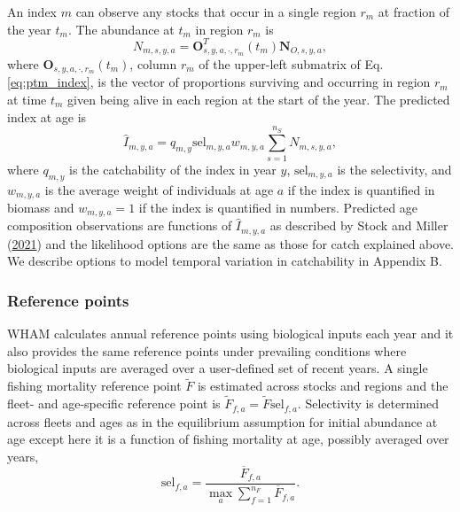 \documentclass[
]{article}
\begin{document}
An index \(m\) can observe any stocks that occur in a single region \(r_m\) at fraction of the year \(t_m\). The abundance at \(t_m\) in region \(r_m\) is
\[N_{m,s,y,a} = \mathbf{O}_{s,y,a,\cdot,r_m}^T(t_m) \mathbf{N}_{O,s,y,a},\]
where \(\mathbf{O}_{s,y,a,\cdot,r_m}(t_m)\), column \(r_m\) of the upper-left submatrix of Eq. \ref{eq:ptm_index}, is the vector of proportions surviving and occurring in region \(r_m\) at time \(t_m\) given being alive in each region at the start of the year. The predicted index at age is
\[\widehat{I}_{m,y,a} = q_{m,y} \text{sel}_{m,y,a}w_{m,y,a}\sum^{n_S}_{s = 1}N_{m,s,y,a},\]
where \(q_{m,y}\) is the catchability of the index in year \(y\), \(\text{sel}_{m,y,a}\) is the selectivity, and \(w_{m,y,a}\) is the average weight of individuals at age \(a\) if the index is quantified in biomass and \(w_{m,y,a} = 1\) if the index is quantified in numbers. Predicted age composition observations are functions of \(\widehat{I}_{m,y,a}\) as described by Stock and Miller (\protect\hyperlink{ref-stockmiller21}{2021}) and the likelihood options are the same as those for catch explained above. We describe options to model temporal variation in catchability in Appendix B.

\hypertarget{reference-points}{%
\subsubsection*{Reference points}\label{reference-points}}

WHAM calculates annual reference points using biological inputs each year and it also provides the same reference points under prevailing conditions where biological inputs are averaged over a user-defined set of recent years. A single fishing mortality reference point \(\widetilde{F}\) is estimated across stocks and regions and the fleet- and age-specific reference point is \(\widetilde{F}_{f,a} = \widetilde{F} \text{sel}_{f,a}\). Selectivity is determined across fleets and ages as in the equilibrium assumption for initial abundance at age except here it is a function of fishing mortality at age, possibly averaged over years,
\begin{equation}\label{eq:spr_sel}
  \text{sel}_{f,a} = \frac{\overline{F}_{f,a}}{\max_a \sum^{n_F}_{f=1}{\overline{F}}_{f,a}}.
\end{equation}
\end{document}
